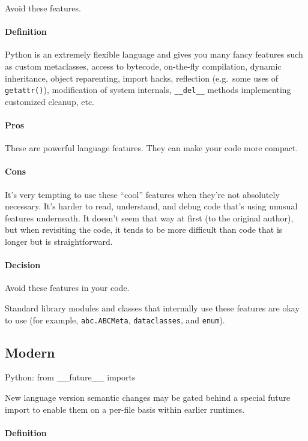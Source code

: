 \documentclass[
]{article}
\begin{document}
Avoid these features.

\paragraph{Definition}

Python is an extremely flexible language and gives you many fancy
features such as custom metaclasses, access to bytecode, on-the-fly
compilation, dynamic inheritance, object reparenting, import hacks,
reflection (e.g.~some uses of \texttt{getattr()}), modification of
system internals, \texttt{\_\_del\_\_} methods implementing customized
cleanup, etc.

\paragraph{Pros}

These are powerful language features. They can make your code more
compact.

\paragraph{Cons}

It's very tempting to use these ``cool'' features when they're not
absolutely necessary. It's harder to read, understand, and debug code
that's using unusual features underneath. It doesn't seem that way at
first (to the original author), but when revisiting the code, it tends
to be more difficult than code that is longer but is straightforward.

\paragraph{Decision}

Avoid these features in your code.

Standard library modules and classes that internally use these features
are okay to use (for example, \texttt{abc.ABCMeta},
\texttt{dataclasses}, and \texttt{enum}).

\subsection{Modern} Python: from \_\_future\_\_ imports

New language version semantic changes may be gated behind a special
future import to enable them on a per-file basis within earlier
runtimes.

\paragraph{Definition}
\end{document}
